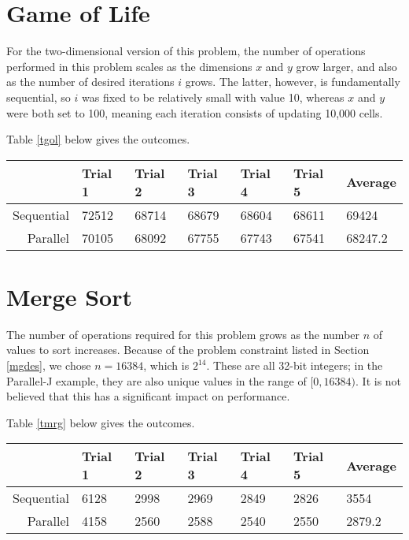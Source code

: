 \section{Game of Life}
For the two-dimensional version of this problem, 
the number of operations performed in this problem scales 
as the dimensions $x$ and $y$ grow larger, 
and also as the number of desired iterations $i$ grows. 
The latter, however, is fundamentally sequential, 
so $i$ was fixed to be relatively small with value 10, 
whereas $x$ and $y$ were both set to 100, 
meaning each iteration consists of updating 10,000 cells.

Table \ref{tgol} below gives the outcomes.

\begin{center}
\begin{tabular}{|r|l|l|l|l|l||l|}
\label{tgol}
	           & Trial 1 & Trial 2 & Trial 3 & Trial 4 & Trial 5 & Average \\ \hline
	Sequential & 72512   & 68714   & 68679   & 68604   & 68611   & 69424   \\ \hline
	Parallel   & 70105   & 68092   & 67755   & 67743   & 67541   & 68247.2 \\ \hline
\end{tabular}
\end{center}

\section{Merge Sort}
The number of operations required for this problem 
grows as the number $n$ of values to sort increases. 
Because of the problem constraint listed in Section \ref{mgdes}, 
we chose $n=16384$, which is $2^14$.
These are all 32-bit integers; 
in the Parallel-J example, they are also unique values 
in the range of $[0,16384)$. 
It is not believed that this has a significant impact on performance.

Table \ref{tmrg} below gives the outcomes.

\begin{center}
\begin{tabular}{|r|l|l|l|l|l||l|}
\label{tmrg}
			   & Trial 1 & Trial 2 & Trial 3 & Trial 4 & Trial 5 & Average \\ \hline
	Sequential & 6128    & 2998    & 2969    & 2849    & 2826    & 3554    \\ \hline
	Parallel   & 4158    & 2560    & 2588    & 2540    & 2550    & 2879.2  \\ \hline
\end{tabular}
\end{center}
